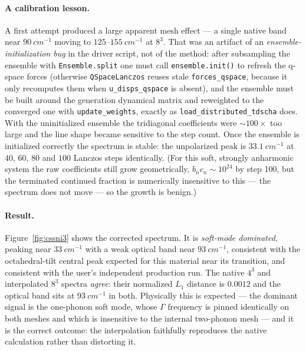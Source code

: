 \documentclass[11pt,a4paper]{article}
\begin{document}
\paragraph{A calibration lesson.}  A first attempt produced a large apparent
mesh effect --- a single native band near $\SI{90}{cm^{-1}}$ moving to
$125$--$\SI{155}{cm^{-1}}$ at $8^3$.  That was an artifact of an
\emph{ensemble-initialization bug} in the driver script, not of the method:
after subsampling the ensemble with \texttt{Ensemble.split} one must call
\texttt{ensemble.init()} to refresh the q-space forces (otherwise
\texttt{QSpaceLanczos} reuses stale \texttt{forces\_qspace}, because it only
recomputes them when \texttt{u\_disps\_qspace} is absent), and the ensemble
must be built around the generation dynamical matrix and reweighted to the
converged one with \texttt{update\_weights}, exactly as
\texttt{load\_distributed\_tdscha} does.  With the uninitialized ensemble the
tridiagonal coefficients were $\sim\!100\times$ too large and the line shape
became sensitive to the step count.  Once the ensemble is initialized
correctly the spectrum is stable: the unpolarized peak is
$\SI{33.1}{cm^{-1}}$ at $40$, $60$, $80$ and $100$ Lanczos steps
identically.  (For this soft, strongly anharmonic system the raw
coefficients still grow geometrically, $b_nc_n\!\sim\!10^{24}$ by step 100,
but the terminated continued fraction is numerically insensitive to this ---
the spectrum does not move --- so the growth is benign.)

\paragraph{Result.}  Figure~\ref{fig:cssni3} shows the corrected spectrum.
It is \emph{soft-mode dominated}, peaking near $\SI{33}{cm^{-1}}$ with a weak
optical band near $\SI{93}{cm^{-1}}$, consistent with the octahedral-tilt
central peak expected for this material near its transition, and consistent
with the user's independent production run.  The native $4^3$ and
interpolated $8^3$ spectra \emph{agree}: their normalized $L_1$ distance is
$0.0012$ and the optical band sits at $\SI{93}{cm^{-1}}$ in both.  Physically
this is expected --- the dominant signal is the one-phonon soft mode, whose
$\Gamma$ frequency is pinned identically on both meshes and which is
insensitive to the internal two-phonon mesh --- and it is the correct
outcome: the interpolation faithfully reproduces the native calculation
rather than distorting it.
\end{document}
